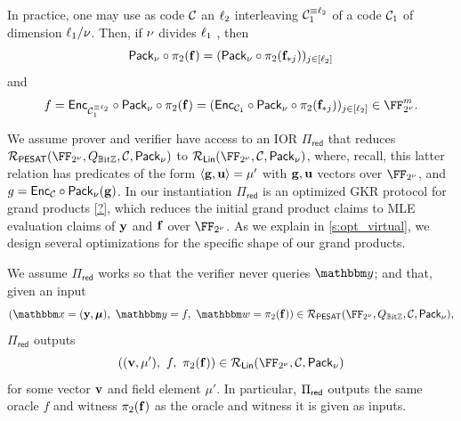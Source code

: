 \documentclass[11pt,letterpaper,usenames,dvipsnames]{article}
\begin{document}
\begin{remark}  \label{r:interleaved_codes} In practice, one may use as code $\mathcal{C}$ an $\ell_2$ interleaving $\mathcal{C}_1^{\equiv \ell_2}$ of a code $\mathcal{C}_1$ of dimension $\ell_1/\nu$. Then, if $\nu$ divides $\ell_1$ ,  then $$\mathsf{Pack}_\nu\circ \pi_{2}(\mathbf{f})=(\mathsf{Pack}_\nu\circ \pi_{2}(\mathbf{f}_{*j}))_{j\in [\ell_2]}$$
%
and 
 $$f = \Enc_{\cC_1^{\equiv \codedim_2}}\circ\pack\circ \picomfield(\bff) =  (\Enc_{\cC_1}\circ \pack\circ \picomfield(\bff_{*j}))_{j\in [\codedim_2]}\in \comfield^{\codelength}.$$
%
%
\end{remark}

   

%
We assume prover and verifier have access to an IOR $\Pi_{\mathsf{red}}$  that reduces 
%
$
\PESAT(\comfield, Q_{\mathbb{B}\text{it}\ZZ},\cC, \pack)$ to $\LIN(\comfield, \cC, \pack)$, where, recall, this latter relation has predicates of the form $\langle \mathbf{g}, \mathbf{u}\rangle = \mu'$ with $\mathbf{g},\mathbf{u}$ vectors over $\comfield$, and $g=\mathsf{Enc}_{\mathcal{C}}\circ \mathsf{Pack}_\nu(\mathbf{g})$.   In our instantiation $\Pi_{\mathsf{red}}$ is an optimized GKR protocol for  grand products \cref{?}, which reduces the initial grand product claims to MLE evaluation claims of $\mathbf{y}$ and $\mathbf{f}$ over $\comfield$. As we explain in \cref{s:opt_virtual}, we design several optimizations for the specific shape of our grand products.

%
%
We assume $\Pi_{\mathsf{red}}$ works so that the verifier never queries $\oracle$; and that, given an input
%
$$\left(\inp=(\yy,\bm{\mu}),\  \oracle= f, \ \wit=\picomfield(\bff)\right)\in \PESAT(\comfield, Q_{\mathbb{B}\text{it}\ZZ},\cC, \pack),$$
%
$\Pi_{\mathsf{red}}$ outputs
%
$$
\left((\vv, \mu'), \ f, \ \picomfield(\bff)\right) \in \LIN( \comfield,\cC,\pack)$$ for some vector $\mathbf{v}$ and field element $\mu'$. In particular, $\Pi_{\mathsf{red}}$ outputs the same oracle $f$ and witness $\pi_2(\mathbf{f})$ as the oracle and witness it is given as inputs. 
\end{document}

